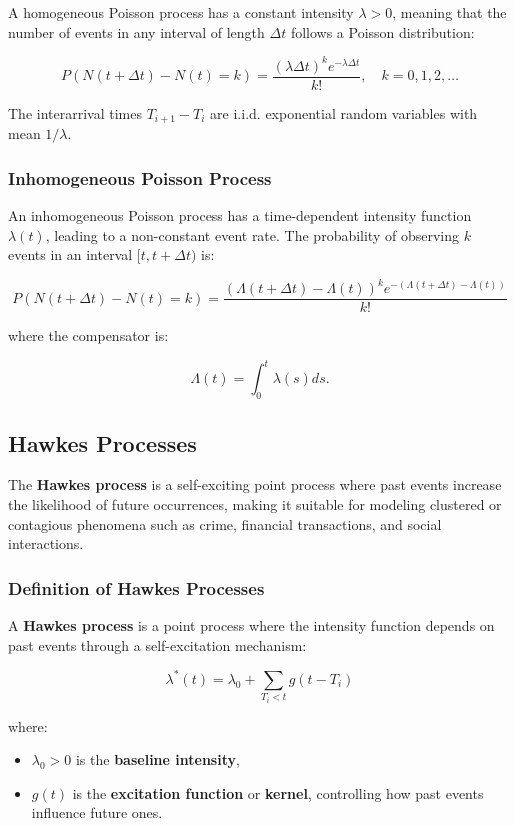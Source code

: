 \documentclass[11pt]{article}
\begin{document}
A homogeneous Poisson process has a constant intensity $\lambda > 0$, meaning that the number of events in any interval of length $\Delta t$ follows a Poisson distribution:

\[
  P(N(t+\Delta t) - N(t) = k) = \frac{(\lambda \Delta t)^k e^{-\lambda \Delta t}}{k!}, \quad k = 0,1,2,\dots
\]

The interarrival times $T_{i+1} - T_i$ are i.i.d. exponential random variables with mean $1/\lambda$.

\subsubsection{Inhomogeneous Poisson Process}

An inhomogeneous Poisson process has a time-dependent intensity function $\lambda(t)$, leading to a non-constant event rate. The probability of observing $k$ events in an interval $[t, t+\Delta t)$ is:

\[
  P(N(t+\Delta t) - N(t) = k) = \frac{(\Lambda(t+\Delta t) - \Lambda(t))^k e^{-(\Lambda(t+\Delta t) - \Lambda(t))}}{k!}
\]

where the compensator is:

\[
  \Lambda(t) = \int_0^t \lambda(s) ds.
\]

\subsection{Hawkes Processes}

The \textbf{Hawkes process} is a self-exciting point process where past events increase the likelihood of future occurrences, making it suitable for modeling clustered or contagious phenomena such as crime, financial transactions, and social interactions.

\subsubsection{Definition of Hawkes Processes}

A \textbf{Hawkes process} is a point process where the intensity function depends on past events through a self-excitation mechanism:

\[
  \lambda^*(t) = \lambda_0 + \sum_{T_i < t} g(t - T_i)
\]

where:

\begin{itemize}
  \item $\lambda_0 > 0$ is the \textbf{baseline intensity},
  \item $g(t)$ is the \textbf{excitation function} or \textbf{kernel}, controlling how past events influence future ones.
\end{itemize}
\end{document}
